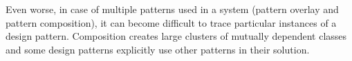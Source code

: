 Even worse, in case of multiple patterns used in a system (pattern overlay and pattern composition), it can become difficult to trace particular instances of a design pattern. 
Composition creates large clusters of mutually dependent classes\cite{sullivan2002advanced} and some design patterns explicitly use other patterns in their solution.









